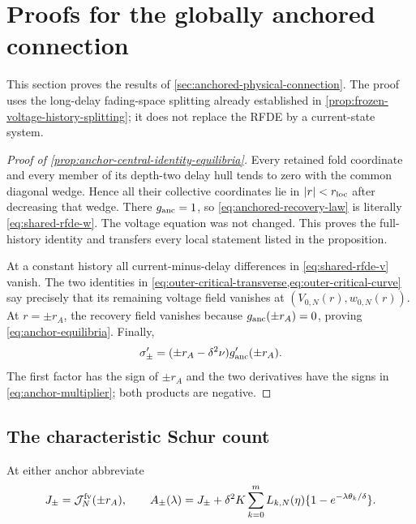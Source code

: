 \section{Proofs for the globally anchored connection}
\label{sec:supplementary-anchored-connection}

This section proves the results of
\cref{sec:anchored-physical-connection}.  The proof uses the long-delay
fading-space splitting already established in
\cref{prop:frozen-voltage-history-splitting}; it does not replace the RFDE by
a current-state system.

\begin{proof}[Proof of \cref{prop:anchor-central-identity-equilibria}]
Every retained fold coordinate and every member of its depth-two delay hull
tends to zero with the common diagonal wedge.  Hence all their collective
coordinates lie in \(|r|<r_{\rm loc}\) after decreasing that wedge.  There
\(g_{\rm anc}=1\), so \cref{eq:anchored-recovery-law} is literally
\cref{eq:shared-rfde-w}.  The voltage equation was not changed.  This proves
the full-history identity and transfers every local statement listed in the
proposition.

At a constant history all current-minus-delay differences in
\cref{eq:shared-rfde-v} vanish.  The two identities in
\cref{eq:outer-critical-transverse,eq:outer-critical-curve} say precisely
that its remaining voltage field vanishes at
\((V_{0,N}(r),w_{0,N}(r))\).  At \(r=\pm r_A\), the recovery field vanishes
because \(g_{\rm anc}(\pm r_A)=0\), proving
\cref{eq:anchor-equilibria}.  Finally,
\[
 \sigma_\pm'=(\pm r_A-\delta^2\nu)g_{\rm anc}'(\pm r_A).
\]
The first factor has the sign of \(\pm r_A\) and the two derivatives have
the signs in \cref{eq:anchor-multiplier}; both products are negative.
\end{proof}

\subsection{The characteristic Schur count}

At either anchor abbreviate
\begin{equation}
 J_\pm=\mathcal J^{\rm fv}_N(\pm r_A),\qquad
 A_\pm(\lambda)
 =J_\pm+\delta^2K\sum_{k=0}^mL_{k,N}(\eta)
       \{1-e^{-\lambda\theta_k/\delta}\}.           \label{eq:anchor-characteristic-voltage-pencil}
\end{equation}


